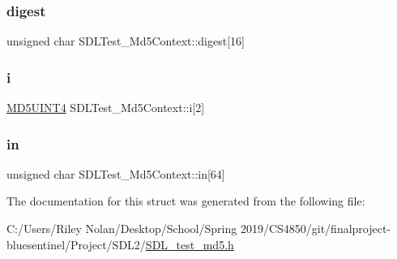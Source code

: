 \mbox{\label{struct_s_d_l_test___md5_context_ab29079997a9f35e5d52c2aac3ad28f90}} 
\subsubsection{\texorpdfstring{digest}{digest}}
{\footnotesize\ttfamily unsigned char S\+D\+L\+Test\+\_\+\+Md5\+Context\+::digest\mbox{[}16\mbox{]}}

\mbox{\label{struct_s_d_l_test___md5_context_a95b3d5fd74fd1b7a27bf96f3bb32beb4}} 
\subsubsection{\texorpdfstring{i}{i}}
{\footnotesize\ttfamily \mbox{\hyperlink{_s_d_l__test__md5_8h_a2bdcfd1b3373be8191c70eb4a7cb84c6}{M\+D5\+U\+I\+N\+T4}} S\+D\+L\+Test\+\_\+\+Md5\+Context\+::i\mbox{[}2\mbox{]}}

\mbox{\label{struct_s_d_l_test___md5_context_a337638ef799dc0ad9397ea9b175ea388}} 
\subsubsection{\texorpdfstring{in}{in}}
{\footnotesize\ttfamily unsigned char S\+D\+L\+Test\+\_\+\+Md5\+Context\+::in\mbox{[}64\mbox{]}}



The documentation for this struct was generated from the following file\+:\begin{DoxyCompactItemize}
\item 
C\+:/\+Users/\+Riley Nolan/\+Desktop/\+School/\+Spring 2019/\+C\+S4850/git/finalproject-\/bluesentinel/\+Project/\+S\+D\+L2/\mbox{\hyperlink{_s_d_l__test__md5_8h}{S\+D\+L\+\_\+test\+\_\+md5.\+h}}\end{DoxyCompactItemize}
